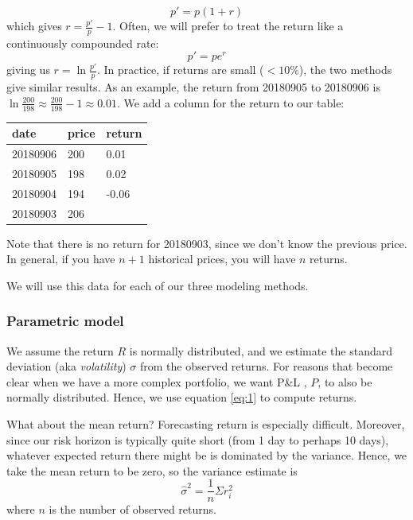 \documentclass{report}
\numberwithin{problem}{chapter} %
\newcommand{\ds}{\displaystyle}
\newcommand{\pnl}{P\&L }
\begin{document}
\begin{equation}
\label{eq:1}
p'=p(1+r)
\end{equation}
which gives $r=\frac{p'}{p}-1$. Often, we will prefer to treat the return like a continuously compounded rate:
\begin{equation}
\label{eq:2}
p'=pe^r
\end{equation}
giving us $r=\ln {\frac{p'}{p}}$. In practice, if returns are small ($< 10\%$), the two methods give similar results. As an example, the return from 20180905 to 20180906 is  $\ln{\frac{200}{198}} \approx  \frac{200}{198} - 1 \approx 0.01$. We add a column for the return to our table:

\begin{center}
\begin{tabular}{lrr}
\textbf{date}                  & \textbf{price}           & \textbf{return}            \\ \hline
\multicolumn{1}{|l|}{20180906} & \multicolumn{1}{l|}{200} & \multicolumn{1}{l|}{0.01}  \\ \hline
\multicolumn{1}{|l|}{20180905} & \multicolumn{1}{l|}{198} & \multicolumn{1}{l|}{0.02}  \\ \hline
\multicolumn{1}{|l|}{20180904} & \multicolumn{1}{l|}{194} & \multicolumn{1}{l|}{-0.06} \\ \hline
\multicolumn{1}{|l|}{20180903} & \multicolumn{1}{l|}{206} & \multicolumn{1}{l|}{}      \\ \hline
\end{tabular}
\end{center}
Note that there is no return for 20180903, since we don't know the previous price. In general, if you have $n+1$ historical prices, you will have $n$ returns.

We will use this data for each of our three modeling methods.

\subsubsection{Parametric model}
We assume the return $R$ is normally distributed, and we estimate the standard deviation (aka {\it volatility}) $\sigma$ from the observed returns. For reasons that become clear when we have a more complex portfolio, we want \pnl, $P$, to also be normally distributed. Hence, we use equation \ref{eq:1} to compute returns. 

What about the mean return? Forecasting return is especially difficult. Moreover, since our risk horizon is typically quite short (from 1 day to perhaps 10 days), whatever expected return there might be is dominated by the variance. Hence, we take the mean return to be zero, so the variance estimate is 
\begin{equation}
\ds \hat{\sigma}^2 =\frac{1}{n} \Sigma r_i^2
\end{equation}
where $n$ is the number of observed returns. 
\end{document}

